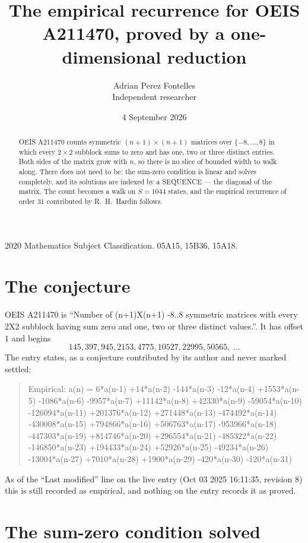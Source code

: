 \documentclass[11pt,a4paper]{article}
\title{The empirical recurrence for OEIS A211470, proved by a one-dimensional reduction}
\author{Adrian Perez Fontelles\\ \small Independent researcher}
\date{4 September 2026}
\theoremstyle{plain}
\theoremstyle{definition}
\begin{document}
\maketitle

\begin{abstract}
OEIS A211470 counts symmetric $(n+1)\times(n+1)$ matrices over
$\{-8,\dots,8\}$ in which every $2\times2$ subblock sums to zero and has one, two or three distinct
entries. Both sides of the matrix grow with $n$, so there is no slice of bounded width to walk
along. There does not need to be: the sum-zero condition is linear and solves completely, and
its solutions are indexed by a SEQUENCE --- the diagonal of the matrix. The count becomes a walk
on $S=1044$ states, and the empirical recurrence of order $31$ contributed by R.~H.~Hardin
follows.
\end{abstract}

\noindent\small 2020 Mathematics Subject Classification. 05A15, 15B36, 15A18.\normalsize

\section{The conjecture}

OEIS A211470 is ``Number of (n+1)X(n+1) -8..8 symmetric matrices with every 2X2 subblock having sum zero and one, two or three distinct values.''. It has offset $1$ and begins
\[
145, 397, 945, 2153, 4775, 10527, 22995, 50565,\ \dots
\]
The entry states, as a conjecture contributed by its author and never marked settled:
\begin{quote}
Empirical: a(n) = 6*a(n-1) +14*a(n-2) -144*a(n-3) -12*a(n-4) +1553*a(n-5) -1086*a(n-6) -9957*a(n-7) +11142*a(n-8) +42330*a(n-9) -59054*a(n-10) -126094*a(n-11) +201376*a(n-12) +271448*a(n-13) -474492*a(n-14) -430008*a(n-15) +794866*a(n-16) +506763*a(n-17) -953966*a(n-18) -447303*a(n-19) +814746*a(n-20) +296554*a(n-21) -485322*a(n-22) -146850*a(n-23) +194433*a(n-24) +52926*a(n-25) -49234*a(n-26) -13004*a(n-27) +7010*a(n-28) +1900*a(n-29) -420*a(n-30) -120*a(n-31)
\end{quote}
As of the ``Last modified'' line on the live entry (Oct 03 2025 16:11:35, revision 8) this is still
recorded as empirical, and nothing on the entry records it as proved.

\section{The sum-zero condition solved}
\end{document}
